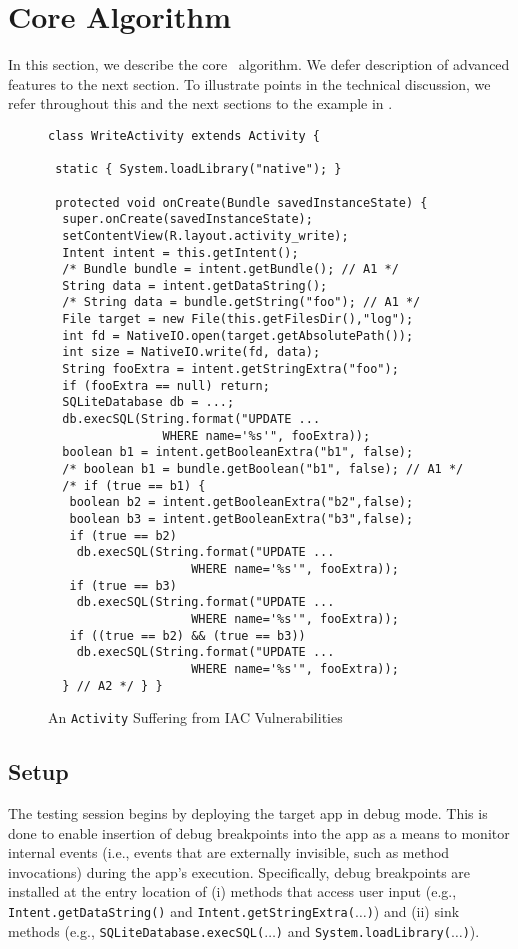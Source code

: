 \section{Core Algorithm}\label{Se:corealg}

In this section, we describe the core \Tool\ algorithm. We defer description of advanced features to the next section. To illustrate points in the technical discussion, we refer throughout this and the next sections to the example in .

\begin{figure}
\begin{lstlisting}[showstringspaces=false]
class WriteActivity extends Activity {

 static { System.loadLibrary("native"); }

 protected void onCreate(Bundle savedInstanceState) {
  super.onCreate(savedInstanceState);
  setContentView(R.layout.activity_write);
  Intent intent = this.getIntent();
  /* Bundle bundle = intent.getBundle(); // A1 */	
  String data = intent.getDataString();	
  /* String data = bundle.getString("foo"); // A1 */		
  File target = new File(this.getFilesDir(),"log");
  int fd = NativeIO.open(target.getAbsolutePath());	
  int size = NativeIO.write(fd, data);		 
  String fooExtra = intent.getStringExtra("foo");
  if (fooExtra == null) return;	
  SQLiteDatabase db = ...;
  db.execSQL(String.format("UPDATE ... 
  				WHERE name='%s'", fooExtra));	
  boolean b1 = intent.getBooleanExtra("b1", false);
  /* boolean b1 = bundle.getBoolean("b1", false); // A1 */		
  /* if (true == b1) {
   boolean b2 = intent.getBooleanExtra("b2",false);
   boolean b3 = intent.getBooleanExtra("b3",false);
   if (true == b2)
    db.execSQL(String.format("UPDATE ... 
    				WHERE name='%s'", fooExtra));
   if (true == b3)
    db.execSQL(String.format("UPDATE ... 
    				WHERE name='%s'", fooExtra));
   if ((true == b2) && (true == b3))
    db.execSQL(String.format("UPDATE ... 
    				WHERE name='%s'", fooExtra)); 
  } // A2 */ } }
\end{lstlisting}
\caption{\label{Fi:techExample}An \texttt{Activity} Suffering from IAC Vulnerabilities}
\end{figure}

\subsection{Setup}

The testing session begins by deploying the target app in debug mode. This is done to enable insertion of debug breakpoints into the app as a means to monitor internal events (i.e., events that are externally invisible, such as method invocations) during the app's execution. Specifically, debug breakpoints are installed at the entry location of (i) methods that access user input (e.g., {\tt Intent.getDataString()} and {\tt Intent.getStringExtra($\ldots$)}) and (ii) sink methods (e.g., {\tt SQLiteDatabase.execSQL($\ldots$)} and {\tt System.loadLibrary($\ldots$)}).

